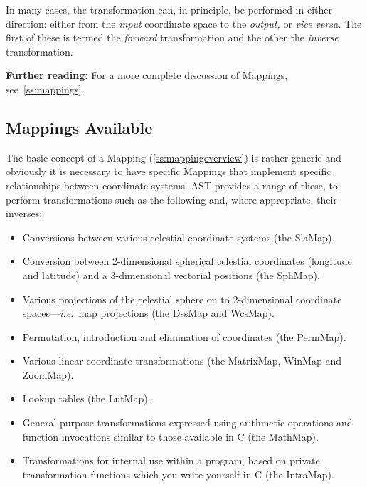 \documentclass[twoside,11pt]{article}
\newcommand{\htmlref}[2]{#1}
\newcommand{\secref}[1]{\S\ref{#1}}
\renewcommand{\secref}[1]{\ref{#1}}
\begin{document}
In many cases, the transformation can, in principle, be performed in
either direction: either from the {\em{input}} coordinate space to the
{\em{output,}} or {\em{vice versa.}} The first of these is termed the
{\em{forward}} transformation and the other the {\em{inverse}}
transformation.

{\bf{Further reading:}} For a more complete discussion of Mappings,
see~\secref{ss:mappings}.

\subsection{\label{ss:mappingselection}Mappings Available}

The basic concept of a \htmlref{Mapping}{Mapping} (\secref{ss:mappingoverview}) is rather
generic and obviously it is necessary to have specific Mappings that
implement specific relationships between coordinate systems. AST
provides a range of these, to perform transformations such as the
following and, where appropriate, their inverses:

\begin{itemize}
\item Conversions between various celestial coordinate systems (the
\htmlref{SlaMap}{SlaMap}).

\item Conversion between 2-dimensional spherical celestial coordinates
(longitude and latitude) and a 3-dimensional vectorial positions (the \htmlref{SphMap}{SphMap}).

\item Various projections of the celestial sphere on to 2-dimensional
coordinate spaces---{\em{i.e.}}\ map projections (the \htmlref{DssMap}{DssMap} and \htmlref{WcsMap}{WcsMap}).

\item Permutation, introduction and elimination of coordinates (the
\htmlref{PermMap}{PermMap}).

\item Various linear coordinate transformations (the \htmlref{MatrixMap}{MatrixMap}, \htmlref{WinMap}{WinMap}
and \htmlref{ZoomMap}{ZoomMap}).

\item Lookup tables (the \htmlref{LutMap}{LutMap}).

\item General-purpose transformations expressed using arithmetic
operations and function invocations similar to those available in C
(the \htmlref{MathMap}{MathMap}).

\item Transformations for internal use within a program, based on
private transformation functions which you write yourself in C (the
\htmlref{IntraMap}{IntraMap}).
\end{itemize}
\end{document}
